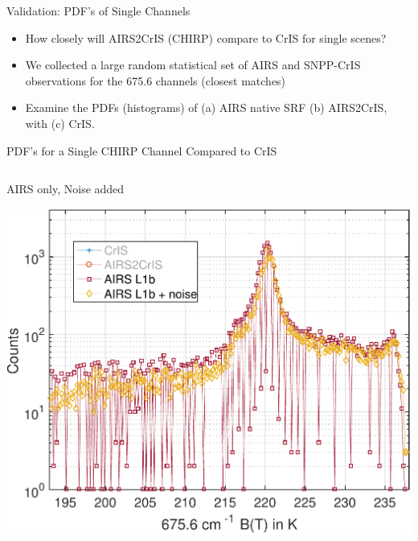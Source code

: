 \documentclass[10pt,t]{beamer}
\begin{document}
\begin{frame}[label={sec:orgabf5fb7}]{Validation: PDF's of Single Channels}
\begin{itemize}
\item How closely will AIRS2CrIS (CHIRP) compare to CrIS for single scenes?
\item We collected a large random statistical set of AIRS and SNPP-CrIS observations for the 675.6 \wn channels (closest matches)
\item Examine the PDFs (histograms) of (a) AIRS native SRF (b) AIRS2CrIS, with (c) CrIS.
\end{itemize}
\end{frame}

\begin{frame}[label={sec:org3f462d9}]{PDF's for a Single CHIRP Channel Compared to CrIS}
\vspace{-0.35in}
\begin{columns}
\begin{column}{0.55\columnwidth}
\begin{block}{\footnotesize AIRS only, Noise added}
\vspace{-0.05in}
\vspace{-0.05in}
\begin{center}
\includegraphics[width=0.77\linewidth]{./Figs/Pdf/jun4_2015_airs_675wn_global_counts_w_airsnoise.pdf}
\end{center}
\end{block}
\end{column}


\end{columns}
\end{frame}
\end{document}
